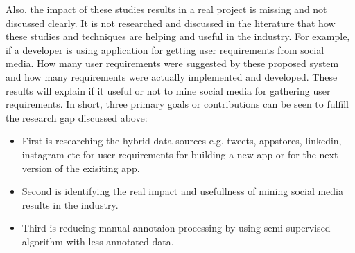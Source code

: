 Also, the impact of these studies results in a real project is missing and
not discussed clearly. It is not researched and discussed in the literature that how these studies and techniques are helping and useful in the industry. For example, if a developer is using application for getting user requirements from social media. How many user requirements were suggested by these proposed system and how many requirements were actually implemented and developed. These results will explain if it useful or not to mine social media for gathering user requirements. In short, three primary goals or contributions can be seen to fulfill the research gap discussed above:\\
\begin{itemize}
  \item First is researching the hybrid data sources e.g. tweets, appstores, linkedin, instagram etc for user requirements for building a new app or for the next version of the exisiting app.
  \item Second is identifying the real impact and usefullness of mining social media results in the industry.
  \item Third is reducing manual annotaion processing by using semi supervised algorithm with less annotated data.
\end{itemize}

\newpage